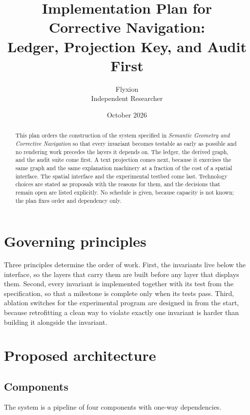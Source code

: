 \documentclass[11pt]{article}
\title{Implementation Plan for Corrective Navigation:\\
Ledger, Projection Key, and Audit First}
\author{Flyxion\\Independent Researcher}
\date{October 2026}
\begin{document}
\maketitle

\begin{abstract}
\noindent
This plan orders the construction of the system specified in \emph{Semantic Geometry and Corrective Navigation} so that every invariant becomes testable as early as possible and no rendering work precedes the layers it depends on. The ledger, the derived graph, and the audit suite come first. A text projection comes next, because it exercises the same graph and the same explanation machinery at a fraction of the cost of a spatial interface. The spatial interface and the experimental testbed come last. Technology choices are stated as proposals with the reasons for them, and the decisions that remain open are listed explicitly. No schedule is given, because capacity is not known; the plan fixes order and dependency only.
\end{abstract}

\section{Governing principles}

Three principles determine the order of work. First, the invariants live below the interface, so the layers that carry them are built before any layer that displays them. Second, every invariant is implemented together with its test from the specification, so that a milestone is complete only when its tests pass. Third, ablation switches for the experimental program are designed in from the start, because retrofitting a clean way to violate exactly one invariant is harder than building it alongside the invariant.

\section{Proposed architecture}

\subsection{Components}

The system is a pipeline of four components with one-way dependencies.
\end{document}
